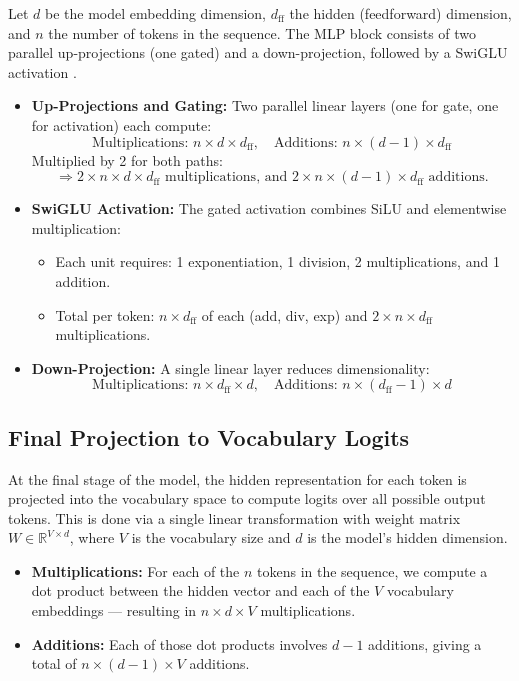 \documentclass[a4paper,12pt]{article}
\begin{document}
Let $d$ be the model embedding dimension, $d_{\text{ff}}$ the hidden (feedforward) dimension, and $n$ the number of tokens in the sequence. The MLP block consists of two parallel up-projections (one gated) and a down-projection, followed by a SwiGLU activation \citep{shazeer2020glu}.

\begin{itemize}
  \item \textbf{Up-Projections and Gating:} Two parallel linear layers (one for gate, one for activation) each compute:
  \[
  \text{Multiplications: } n \times d \times d_{\text{ff}}, \quad
  \text{Additions: } n \times (d - 1) \times d_{\text{ff}}
  \]
  Multiplied by 2 for both paths:
  \[
  \Rightarrow 2 \times n \times d \times d_{\text{ff}} \text{ multiplications, and } 2 \times n \times (d - 1) \times d_{\text{ff}} \text{ additions.}
  \]

  \item \textbf{SwiGLU Activation:} The gated activation combines SiLU and elementwise multiplication:
  \begin{itemize}
    \item Each unit requires: 1 exponentiation, 1 division, 2 multiplications, and 1 addition.
    \item Total per token: $n \times d_{\text{ff}}$ of each (add, div, exp) and $2 \times n \times d_{\text{ff}}$ multiplications.
  \end{itemize}

  \item \textbf{Down-Projection:} A single linear layer reduces dimensionality:
  \[
  \text{Multiplications: } n \times d_{\text{ff}} \times d, \quad
  \text{Additions: } n \times (d_{\text{ff}} - 1) \times d
  \]
\end{itemize}


\subsection*{Final Projection to Vocabulary Logits}

At the final stage of the model, the hidden representation for each token is projected into the vocabulary space to compute logits over all possible output tokens. This is done via a single linear transformation with weight matrix $W \in \mathbb{R}^{V \times d}$, where $V$ is the vocabulary size and $d$ is the model's hidden dimension.

\begin{itemize}
  \item \textbf{Multiplications:} For each of the $n$ tokens in the sequence, we compute a dot product between the hidden vector and each of the $V$ vocabulary embeddings — resulting in $n \times d \times V$ multiplications.
  \item \textbf{Additions:} Each of those dot products involves $d-1$ additions, giving a total of $n \times (d - 1) \times V$ additions.
\end{itemize}
\end{document}
